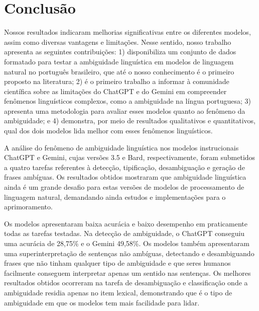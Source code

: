 \documentclass[portuguese]{textolivre}
\begin{document}
\begin{polyabstract}
\begin{english}
\begin{abstract}

\end{abstract}
\end{english}
\end{polyabstract}








\section{Conclusão}\label{sec-conclusao}

Nossos resultados indicaram melhorias significativas entre os diferentes modelos, assim como diversas vantagens e limitações. Nesse sentido, nosso trabalho apresenta as seguintes contribuições: 1) disponibiliza um conjunto de dados formatado para testar a ambiguidade linguística em modelos de linguagem natural no português brasileiro, que até o nosso conhecimento é o primeiro proposto na literatura; 2) é o primeiro trabalho a informar à comunidade científica sobre as limitações do ChatGPT e do Gemini em compreender fenômenos linguísticos complexos, como a ambiguidade na língua portuguesa; 3) apresenta uma metodologia para avaliar esses modelos quanto ao fenômeno da ambiguidade; e 4) demonstra, por meio de resultados qualitativos e quantitativos, qual dos dois modelos lida melhor com esses fenômenos linguísticos.

A análise do fenômeno de ambiguidade linguística nos modelos instrucionais ChatGPT e Gemini, cujas versões 3.5 e Bard, respectivamente, foram submetidos a quatro tarefas referentes à detecção, tipificação, desambiguação e geração de frases ambíguas. Os resultados obtidos mostraram que ambiguidade linguística ainda é um grande desafio para estas versões de modelos de processamento de linguagem natural, demandando ainda estudos e implementações para o aprimoramento.

Os modelos apresentaram baixa acurácia e baixo desempenho em praticamente todas as tarefas testadas. Na detecção de ambiguidade, o ChatGPT conseguiu uma acurácia de 28,75\% e o Gemini 49,58\%. Os modelos também apresentaram uma superinterpretação de sentenças não ambíguas, detectando e desambiguando frases que não tinham qualquer tipo de ambiguidade e que seres humanos facilmente conseguem interpretar apenas um sentido nas sentenças. Os melhores resultados obtidos ocorreram na tarefa de desambiguação e classificação onde a ambiguidade residia apenas no item lexical, demonstrando que é o tipo de ambiguidade em que os modelos tem mais facilidade para lidar. 
\end{document}
